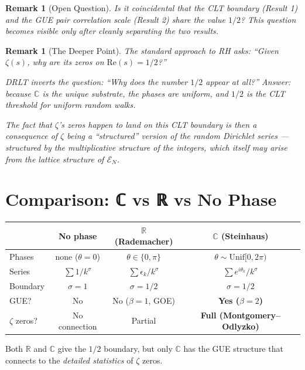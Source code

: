 \documentclass[11pt]{article}
\newtheorem{remark}[theorem]{Remark}
\begin{document}
\begin{remark}[Open Question]
Is it coincidental that the CLT boundary (Result 1)
and the GUE pair correlation scale (Result 2) share the
value $1/2$?  This question becomes visible only after
cleanly separating the two results.
\end{remark}

\begin{remark}[The Deeper Point]
The standard approach to RH asks: ``Given $\zeta(s)$, why are
its zeros on $\mathrm{Re}(s) = 1/2$?''

DRLT inverts the question: ``Why does the number $1/2$ appear at all?''
Answer: because $\mathbb{C}$ is the unique substrate, the phases are
uniform, and $1/2$ is the CLT threshold for uniform random walks.

The fact that $\zeta$'s zeros happen to land on this CLT boundary
is then a consequence of $\zeta$ being a ``structured'' version of
the random Dirichlet series --- structured by the multiplicative
structure of the integers, which itself may arise from the lattice
structure of $\mathcal{E}_N$.
\end{remark}

\section{Comparison: ℂ vs ℝ vs No Phase}

\begin{center}
\renewcommand{\arraystretch}{1.3}
\begin{tabular}{lccc}
\hline
& \textbf{No phase} & \textbf{$\mathbb{R}$ (Rademacher)} & \textbf{$\mathbb{C}$ (Steinhaus)} \\
\hline
Phases & none ($\theta = 0$) & $\theta \in \{0, \pi\}$ & $\theta \sim \mathrm{Unif}[0,2\pi)$ \\
Series & $\sum 1/k^\sigma$ & $\sum \epsilon_k / k^\sigma$ & $\sum e^{i\theta_k}/k^\sigma$ \\
Boundary & $\sigma = 1$ & $\sigma = 1/2$ & $\sigma = 1/2$ \\
GUE? & No & No ($\beta = 1$, GOE) & \textbf{Yes ($\beta = 2$)} \\
$\zeta$ zeros? & No connection & Partial & \textbf{Full (Montgomery--Odlyzko)} \\
\hline
\end{tabular}
\end{center}

Both $\mathbb{R}$ and $\mathbb{C}$ give the $1/2$ boundary,
but only $\mathbb{C}$ has the GUE structure that connects to the
\emph{detailed statistics} of $\zeta$ zeros.
\end{document}
